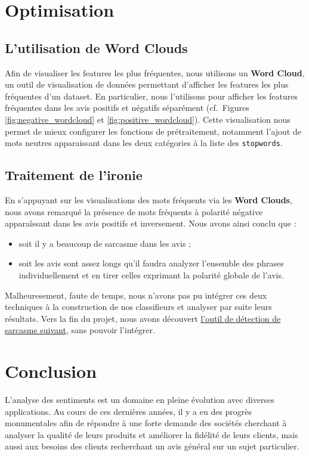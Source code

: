 \documentclass[12pt,a4paper]{report}
\theoremstyle{definition}
\begin{document}
\chapter{Optimisation}
\section{L'utilisation de Word Clouds}
Afin de visualiser les features les plus fréquentes, nous utilisons un \textbf{Word Cloud}, un outil de visualisation de données permettant d'afficher les features les plus fréquentes d'un dataset. En particulier, nous l'utilisons pour afficher les features fréquentes dans les avis positifs et négatifs séparément (cf.~Figures \ref{fig:negative_wordcloud} et \ref{fig:positive_wordcloud}). Cette visualisation nous permet de mieux configurer les fonctions de prétraitement, notamment l'ajout de mots neutres apparaissant dans les deux catégories à la liste des \texttt{stopwords}.

\section{Traitement de l'ironie}
En s'appuyant sur les visualisations des mots fréquents via les \textbf{Word Clouds}, nous avons remarqué la présence de mots fréquents à polarité négative apparaîssant dans les avis positifs et inversement. Nous avons ainsi conclu que :
\begin{itemize}
  \item soit il y a beaucoup de sarcasme dans les avis ;
  \item soit les avis sont assez longs qu'il faudra analyzer l'ensemble des phrases individuellement et en tirer celles exprimant la polarité globale de l'avis.
\end{itemize}

Malheuresement, faute de temps, nous n'avons pas pu intégrer ces deux techniques à la construction de nos classifieurs et analyser par suite leurs résultats. Vers la fin du projet, nous avons découvert \href{https://github.com/MirunaPislar/Sarcasm-Detection}{l'outil de détection de sarcasme suivant}, sans pouvoir l'intégrer.

\chapter{Conclusion}
L'analyse des sentiments est un domaine en pleine évolution avec diverses applications. Au cours de ces dernières années, il y a eu des progrès monumentales afin de répondre à une forte demande des sociétés cherchant à analyser la qualité de leurs produits et améliorer la fidélité de leurs clients, mais aussi aux besoins des clients recherchant un avis général sur un sujet particulier.
\end{document}
